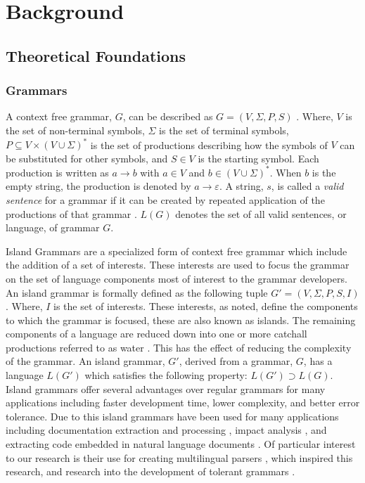 \documentclass[10pt,nocc]{xrese_report}
\begin{document}
\chapter{Background}

\section{Theoretical Foundations}\label{sec:foundations}

\subsection{Grammars}

A context free grammar, $G$, can be described as \(G = (V,\Sigma{},P,S)\) \cite{haoxiang_languages_1988}. Where, \(V\) is the set of non-terminal symbols, \(\Sigma\) is the set of terminal symbols, \(P \subseteq V \times (V\cup\Sigma)^* \) is the set of productions describing how the symbols of \(V\) can be substituted for other symbols, and \(S \in V\) is the starting symbol. Each production is written as \(a \rightarrow b\) with \(a \in V\) and \(b \in (V\cup\Sigma)^* \). When \(b\) is the empty string, the production is denoted by \(a \rightarrow \varepsilon\). A string, $s$, is called a \textit{valid sentence} for a grammar if it can be created by repeated application of the productions of that grammar \cite{moonen_generating_2001}. \(L(G)\) denotes the set of all valid sentences, or language, of grammar \(G\).

Island Grammars are a specialized form of context free grammar which include the addition of a set of interests. These interests are used to focus the grammar on the set of language components most of interest to the grammar developers. An island grammar is formally defined as the following tuple \(G' = (V,\Sigma{},P,S, I)\) \cite{moonen_generating_2001}. Where, $I$ is the set of interests. These interests, as noted, define the components to which the grammar is focused, these are also known as islands. The remaining components of a language are reduced down into one or more catchall productions referred to as water \cite{moonen_generating_2001}. This has the effect of reducing the complexity of the grammar. An island grammar, $G'$, derived from a grammar, $G$, has a language $L(G')$ which satisfies the following property: \(L(G') \supset L(G)\). Island grammars offer several advantages over regular grammars for many applications including faster development time, lower complexity, and better error tolerance. Due to this island grammars have been used for many applications including documentation extraction and processing \cite{deursen_building_1999}, impact analysis \cite{moonen_lightweight_2002}, and extracting code embedded in natural language documents \cite{bettenburg_what_2008,bacchelli_extracting_2011}. Of particular interest to our research is their use for creating multilingual parsers \cite{synytskyy_robust_2003}, which inspired this research, and research into the development of tolerant grammars \cite{klusener_deriving_2003,goloveshkin_tolerant_2018,kurs_bounded_2015}.
\end{document}
